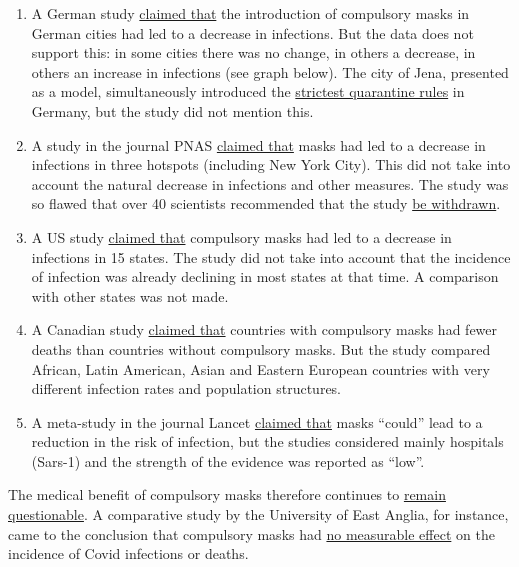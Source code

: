 \begin{enumerate}
\def\labelenumi{\arabic{enumi}.}
\tightlist
\item
  A German study \href{http://ftp.iza.org/dp13319.pdf\#page=28}{claimed
  that} the introduction of compulsory masks in German cities had led to
  a decrease in infections. But the data does not support this: in some
  cities there was no change, in others a decrease, in others an
  increase in infections (see graph below). The city of Jena, presented
  as a model, simultaneously introduced the
  \href{https://www.mdr.de/thueringen/ost-thueringen/jena/corona-jena-seit-einer-woche-keine-neuinfektion-100.html}{strictest
  quarantine rules} in Germany, but the study did not mention this.
\item
  A study in the journal PNAS
  \href{https://www.pnas.org/content/117/26/14857}{claimed that} masks
  had led to a decrease in infections in three hotspots (including New
  York City). This did not take into account the natural decrease in
  infections and other measures. The study was so flawed that over 40
  scientists recommended that the study
  \href{https://reason.com/2020/06/22/prominent-researchers-say-a-widely-cited-study-on-wearing-masks-is-badly-flawed/}{be
  withdrawn}.
\item
  A US study
  \href{https://www.healthaffairs.org/doi/full/10.1377/hlthaff.2020.00818}{claimed
  that} compulsory masks had led to a decrease in infections in 15
  states. The study did not take into account that the incidence of
  infection was already declining in most states at that time. A
  comparison with other states was not made.
\item
  A Canadian study
  \href{https://www.medrxiv.org/content/10.1101/2020.05.22.20109231v3.full.pdf}{claimed
  that} countries with compulsory masks had fewer deaths than countries
  without compulsory masks. But the study compared African, Latin
  American, Asian and Eastern European countries with very different
  infection rates and population structures.
\item
  A meta-study in the journal Lancet
  \href{https://www.thelancet.com/journals/lancet/article/PIIS0140-6736(20)31142-9/fulltext}{claimed
  that} masks ``could'' lead to a reduction in the risk of infection,
  but the studies considered mainly hospitals (Sars-1) and the strength
  of the evidence was reported as ``low''.
\end{enumerate}

The medical benefit of compulsory masks therefore continues to
\href{https://www.cidrap.umn.edu/news-perspective/2020/04/commentary-masks-all-covid-19-not-based-sound-data}{remain
questionable}. A comparative study by the University of East Anglia, for
instance, came to the conclusion that compulsory masks had
\href{https://www.uea.ac.uk/about/-/new-study-reveals-blueprint-for-getting-out-of-covid-19-lockdown}{no
measurable effect} on the incidence of Covid infections or deaths.

